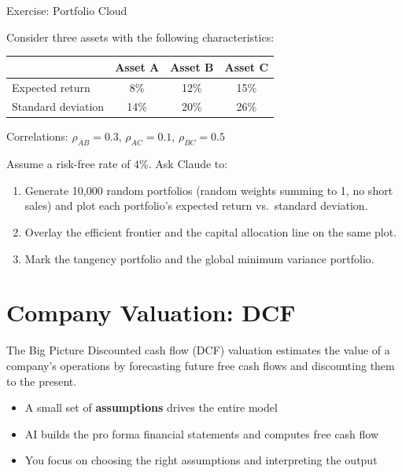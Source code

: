 \documentclass[aspectratio=169]{beamer}
\begin{document}
\begin{frame}[shrink=15]{Exercise: Portfolio Cloud}

Consider three assets with the following characteristics:

\vspace{0.2cm}
\begin{center}\small
\begin{tabular}{@{}l c c c@{}}
\toprule
& \textbf{Asset A} & \textbf{Asset B} & \textbf{Asset C} \\
\midrule
Expected return & 8\% & 12\% & 15\% \\
Standard deviation & 14\% & 20\% & 26\% \\
\bottomrule
\end{tabular}
\end{center}

\vspace{0.1cm}
\begin{center}\small
Correlations: $\rho_{AB} = 0.3$, \quad $\rho_{AC} = 0.1$, \quad $\rho_{BC} = 0.5$
\end{center}

\vspace{0.1cm}
Assume a risk-free rate of 4\%.  Ask Claude to:
\begin{enumerate}
  \item Generate 10{,}000 random portfolios (random weights summing to 1, no short sales) and plot each portfolio's expected return vs.\ standard deviation.
  \item Overlay the efficient frontier and the capital allocation line on the same plot.
  \item Mark the tangency portfolio and the global minimum variance portfolio.
\end{enumerate}
\end{frame}

\section{Company Valuation: DCF}

\begin{frame}{The Big Picture}
Discounted cash flow (DCF) valuation estimates the value of a company's operations by forecasting future free cash flows and discounting them to the present.

\vspace{0.3cm}
\begin{itemize}
  \item A small set of \textbf{assumptions} drives the entire model
  \item AI builds the pro forma financial statements and computes free cash flow
  \item You focus on \alert{choosing the right assumptions} and \alert{interpreting the output}
\end{itemize}
\end{frame}
\end{document}
